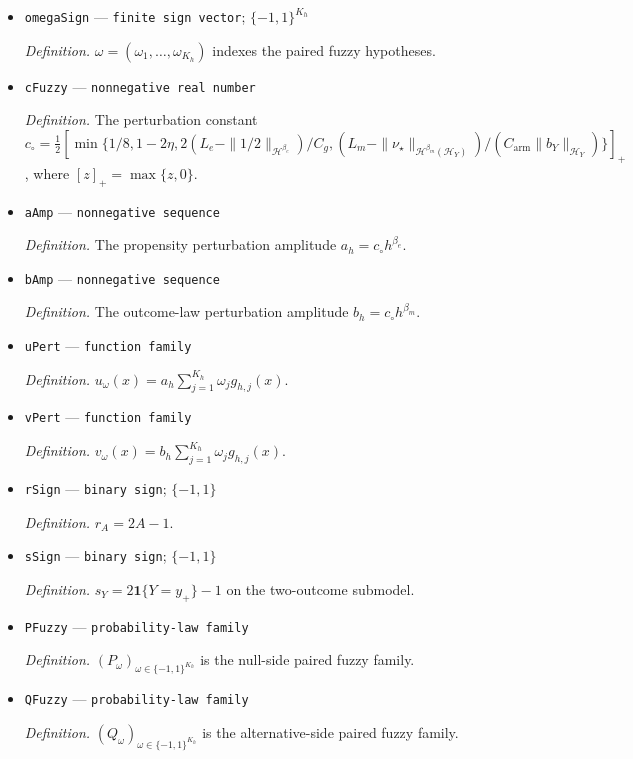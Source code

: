 \documentclass{article}
\begin{document}
\begin{itemize}
  \item \texttt{omegaSign} --- \texttt{finite sign vector}; \(\{-1,1\}^{K_h}\)
  \par\smallskip\noindent\emph{Definition.} \(\omega=(\omega_1,\ldots,\omega_{K_h})\) indexes the paired fuzzy hypotheses.
  \item \texttt{cFuzzy} --- \texttt{nonnegative real number}
  \par\smallskip\noindent\emph{Definition.} The perturbation constant \(c_\circ=\tfrac12[\min\{1/8,1-2\eta,2(L_e-\|1/2\|_{\mathcal H^{\beta_e}})/C_g,(L_m-\|\nu_\star\|_{\mathcal H^{\beta_m}(\mathcal H_Y)})/(C_{\mathrm{arm}}\|b_Y\|_{\mathcal H_Y})\}]_+\), where \([z]_+=\max\{z,0\}\).
  \item \texttt{aAmp} --- \texttt{nonnegative sequence}
  \par\smallskip\noindent\emph{Definition.} The propensity perturbation amplitude \(a_h=c_\circ h^{\beta_e}\).
  \item \texttt{bAmp} --- \texttt{nonnegative sequence}
  \par\smallskip\noindent\emph{Definition.} The outcome-law perturbation amplitude \(b_h=c_\circ h^{\beta_m}\).
  \item \texttt{uPert} --- \texttt{function family}
  \par\smallskip\noindent\emph{Definition.} \(u_\omega(x)=a_h\sum_{j=1}^{K_h}\omega_jg_{h,j}(x)\).
  \item \texttt{vPert} --- \texttt{function family}
  \par\smallskip\noindent\emph{Definition.} \(v_\omega(x)=b_h\sum_{j=1}^{K_h}\omega_jg_{h,j}(x)\).
  \item \texttt{rSign} --- \texttt{binary sign}; \(\{-1,1\}\)
  \par\smallskip\noindent\emph{Definition.} \(r_A=2A-1\).
  \item \texttt{sSign} --- \texttt{binary sign}; \(\{-1,1\}\)
  \par\smallskip\noindent\emph{Definition.} \(s_Y=2\mathbf 1\{Y=y_+\}-1\) on the two-outcome submodel.
  \item \texttt{PFuzzy} --- \texttt{probability-\allowbreak{}law family}
  \par\smallskip\noindent\emph{Definition.} \((P_\omega)_{\omega\in\{-1,1\}^{K_h}}\) is the null-side paired fuzzy family.
  \item \texttt{QFuzzy} --- \texttt{probability-\allowbreak{}law family}
  \par\smallskip\noindent\emph{Definition.} \((Q_\omega)_{\omega\in\{-1,1\}^{K_h}}\) is the alternative-side paired fuzzy family.

\end{itemize}
\end{document}
